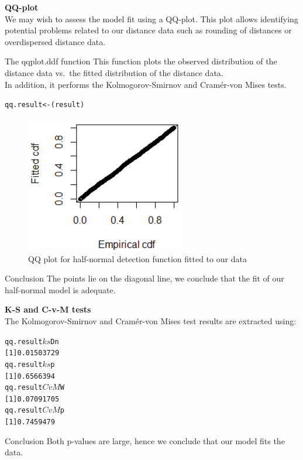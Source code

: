 \noindent \textbf{QQ-plot}\\

\noindent We may wish to assess the model fit using a QQ-plot. This plot allows identifying potential problems related to our distance data such as rounding of distances or overdispersed distance data. 
\begin{block}{The qqplot.ddf function}
This function plots the observed distribution of the distance data vs.\ the fitted distribution of the distance data. \\
In addition, it performs the Kolmogorov-Smirnov and Cram\'{e}r-von Mises tests. 
\end{block}
\begin{knitrout}\footnotesize
{}\color{fgcolor}
\begin{kframe}\begin{alltt}
qq.result <- (result)
\end{alltt}\end{kframe}\end{knitrout}
\begin{figure}[ht]
  \centering
  \includegraphics[width=7cm]{danish/qqresult.png}
\caption{QQ plot for half-normal detection function fitted to our data}
\label{fig:QQ_HN_all}
\end{figure}
\begin{block}{Conclusion}
The points lie on the diagonal line, we conclude that the fit of our half-normal model is adequate. 
\end{block}


\noindent \textbf{K-S and C-v-M tests}\\

\noindent The Kolmogorov-Smirnov and Cram\'{e}r-von Mises test results are extracted using:
\begin{knitrout}\footnotesize
{}\color{fgcolor}
\begin{kframe}
\begin{alltt}
qq.result$ks$Dn
[1] 0.01503729
qq.result$ks$p
[1] 0.6566394
qq.result$CvM$W
[1] 0.07091705
qq.result$CvM$p
[1] 0.7459479
\end{alltt}
\end{kframe}
\end{knitrout}
\begin{block}{Conclusion}
Both p-values are large, hence we conclude that our model fits the data. 
\end{block}

